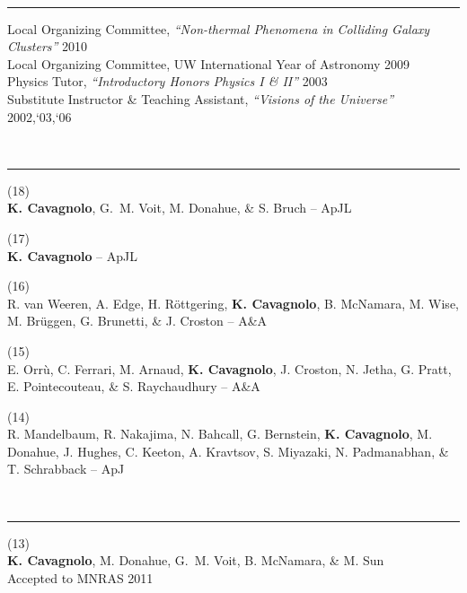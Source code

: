 \documentclass[12pt]{cv}
\newcommand{\myhead}{Cavagnolo, Curriculum Vitae}
\begin{document}
{\large{}}\vspace{-0.3cm}\\
\rule{\linewidth}{0.5pt}
Local Organizing Committee, {\it{``Non-thermal Phenomena in Colliding Galaxy Clusters''}} \hfill 2010\\
Local Organizing Committee, UW International Year of Astronomy \hfill 2009\\
Physics Tutor, {\it{``Introductory Honors Physics I \& II''}} \hfill 2003\\
Substitute Instructor \& Teaching Assistant, {\it{``Visions of the Universe''}} \hfill 2002,`03,`06

\markright{\myhead}
{\large{}}\vspace{-0.3cm}\\
\rule{\linewidth}{0.5pt}
(18) {}\\
{\bf K. Cavagnolo}, G.~M. Voit, M. Donahue, \& S. Bruch -- 
ApJL

(17) {}\\
{\bf K. Cavagnolo} -- 
ApJL

(16) {}\\
R. van Weeren, A. Edge, H. R\"ottgering, {\bf{K. Cavagnolo}}, B. McNamara, M. Wise, M. Br\"uggen, G. Brunetti, \& J. Croston -- 
A\&A

(15) {}\\
E. Orr\`u, C. Ferrari, M. Arnaud, {\bf K. Cavagnolo}, J. Croston, N. Jetha, G. Pratt, E. Pointecouteau, \& S. Raychaudhury -- 
A\&A

(14) {}\\
R. Mandelbaum, R. Nakajima, N. Bahcall, G. Bernstein, {\bf K. Cavagnolo}, M. Donahue, J. Hughes, C. Keeton, A. Kravtsov, S. Miyazaki, N. Padmanabhan, \& T. Schrabback -- 
ApJ

{\large{}}\vspace{-0.3cm}\\
\rule{\linewidth}{0.5pt}
(13) {}\\
{\bf K. Cavagnolo}, M. Donahue, G.~M. Voit, B. McNamara, \& M. Sun\\
Accepted to MNRAS 2011
\end{document}
